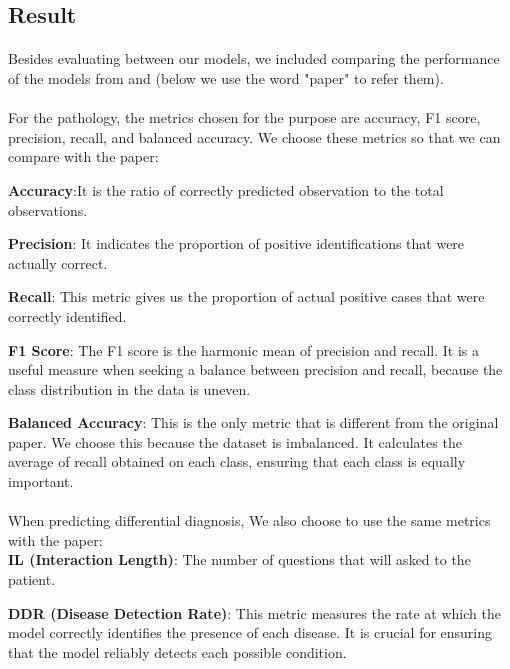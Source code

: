 \documentclass{article}
\begin{document}
\subsection{Result}
\paragraph{ }
Besides evaluating between our models, we included comparing the performance of the models from \parencite{Fansi_2022} and \parencite{Alam_2023} (below we use the word "paper" to refer them).
\paragraph{ }
For the pathology, the metrics chosen for the purpose are accuracy, F1 score, precision, recall, and balanced accuracy. We choose these metrics so that we can compare with the paper:

\textbf{Accuracy}:It is the ratio of correctly predicted observation to the total observations. 

\textbf{Precision}: It indicates the proportion of positive identifications that were actually correct. 

\textbf{Recall}: This metric gives us the proportion of actual positive cases that were correctly identified. 

\textbf{F1 Score}: The F1 score is the harmonic mean of precision and recall. It is a useful measure when seeking a balance between precision and recall, because the class distribution in the data is uneven.

\textbf{Balanced Accuracy}: This is the only metric that is different from the original paper. We choose this because the dataset is imbalanced. It calculates the average of recall obtained on each class, ensuring that each class is equally important.

\paragraph{ }
When predicting differential diagnosis, We also choose to use the same metrics with the paper:\\
\textbf{IL (Interaction Length)}: The number of questions that will asked to the patient.

\textbf{DDR (Disease Detection Rate)}: This metric measures the rate at which the model correctly identifies the presence of each disease. It is crucial for ensuring that the model reliably detects each possible condition.
\end{document}
